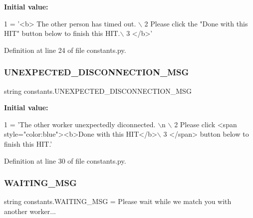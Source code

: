 {\bfseries Initial value\+:}
\begin{DoxyCode}
1 =  \textcolor{stringliteral}{'<b> The other person has timed out. \(\backslash\)}
2 \textcolor{stringliteral}{        Please click the "Done with this HIT" button below to finish this HIT.\(\backslash\)}
3 \textcolor{stringliteral}{        </b>'}
\end{DoxyCode}


Definition at line 24 of file constants.\+py.

\mbox{\label{namespaceconstants_a77533e8b7d96673c5ae41ff7d44474c1}} 
\subsubsection{\texorpdfstring{U\+N\+E\+X\+P\+E\+C\+T\+E\+D\+\_\+\+D\+I\+S\+C\+O\+N\+N\+E\+C\+T\+I\+O\+N\+\_\+\+M\+SG}{UNEXPECTED\_DISCONNECTION\_MSG}}
{\footnotesize\ttfamily string constants.\+U\+N\+E\+X\+P\+E\+C\+T\+E\+D\+\_\+\+D\+I\+S\+C\+O\+N\+N\+E\+C\+T\+I\+O\+N\+\_\+\+M\+SG}

{\bfseries Initial value\+:}
\begin{DoxyCode}
1 =  \textcolor{stringliteral}{'The other worker unexpectedly diconnected. \(\backslash\)n \(\backslash\)}
2 \textcolor{stringliteral}{        Please click <span style="color:blue"><b>Done with this HIT</b>\(\backslash\)}
3 \textcolor{stringliteral}{        </span> button below to finish this HIT.'}
\end{DoxyCode}


Definition at line 30 of file constants.\+py.

\mbox{\label{namespaceconstants_a8dd35a78500be9457e88ca9bb3becffe}} 
\subsubsection{\texorpdfstring{W\+A\+I\+T\+I\+N\+G\+\_\+\+M\+SG}{WAITING\_MSG}}
{\footnotesize\ttfamily string constants.\+W\+A\+I\+T\+I\+N\+G\+\_\+\+M\+SG = \textquotesingle{}Please wait while we match you with another worker...\textquotesingle{}}



